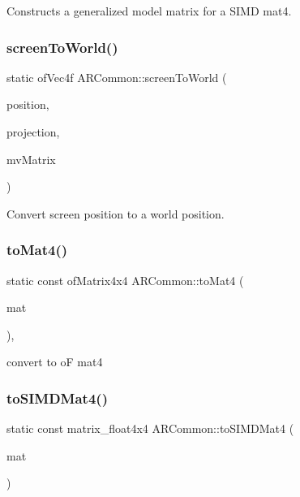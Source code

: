Constructs a generalized model matrix for a S\+I\+MD mat4. 

\mbox{\label{namespace_a_r_common_acc8f469a4596dc7173993ce58068bd2d}} 
\subsubsection{\texorpdfstring{screen\+To\+World()}{screenToWorld()}}
{\footnotesize\ttfamily static of\+Vec4f A\+R\+Common\+::screen\+To\+World (\begin{DoxyParamCaption}\item[{of\+Vec3f}]{position,  }\item[{of\+Matrix4x4}]{projection,  }\item[{of\+Matrix4x4}]{mv\+Matrix }\end{DoxyParamCaption})\hspace{0.3cm}{\ttfamily [static]}}



Convert screen position to a world position. 

\mbox{\label{namespace_a_r_common_a4c4194125c19eb18f43b61b991261dbf}} 
\subsubsection{\texorpdfstring{to\+Mat4()}{toMat4()}}
{\footnotesize\ttfamily static const of\+Matrix4x4 A\+R\+Common\+::to\+Mat4 (\begin{DoxyParamCaption}\item[{const matrix\+\_\+float4x4 \&}]{mat }\end{DoxyParamCaption})\hspace{0.3cm}{\ttfamily [inline]}, {\ttfamily [static]}}



convert to oF mat4 

\mbox{\label{namespace_a_r_common_a94f59f549eb5aec3f077b54ae5e5df86}} 
\subsubsection{\texorpdfstring{to\+S\+I\+M\+D\+Mat4()}{toSIMDMat4()}}
{\footnotesize\ttfamily static const matrix\+\_\+float4x4 A\+R\+Common\+::to\+S\+I\+M\+D\+Mat4 (\begin{DoxyParamCaption}\item[{of\+Matrix4x4 \&}]{mat }\end{DoxyParamCaption})\hspace{0.3cm}{\ttfamily [static]}}



